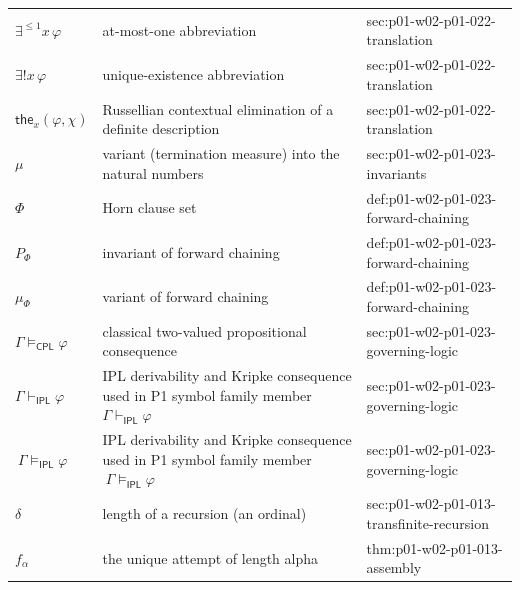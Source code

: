\begin{longtable}{@{}p{}p{}p{}@{}}
\(\exists^{\leq1}x\,\varphi\) & at-most-one abbreviation & sec:\allowbreak{}p01-\allowbreak{}w02-\allowbreak{}p01-\allowbreak{}022-\allowbreak{}translation \\
\(\exists!x\,\varphi\) & unique-existence abbreviation & sec:\allowbreak{}p01-\allowbreak{}w02-\allowbreak{}p01-\allowbreak{}022-\allowbreak{}translation \\
\(\mathsf{the}_x(\varphi,\allowbreak \chi)\) & Russellian contextual elimination of a definite description & sec:\allowbreak{}p01-\allowbreak{}w02-\allowbreak{}p01-\allowbreak{}022-\allowbreak{}translation \\
\(\mu\) & variant (termination measure) into the natural numbers & sec:\allowbreak{}p01-\allowbreak{}w02-\allowbreak{}p01-\allowbreak{}023-\allowbreak{}invariants \\
\(\Phi\) & Horn clause set & def:\allowbreak{}p01-\allowbreak{}w02-\allowbreak{}p01-\allowbreak{}023-\allowbreak{}forward-\allowbreak{}chaining \\
\(P_\Phi\) & invariant of forward chaining & def:\allowbreak{}p01-\allowbreak{}w02-\allowbreak{}p01-\allowbreak{}023-\allowbreak{}forward-\allowbreak{}chaining \\
\(\mu_\Phi\) & variant of forward chaining & def:\allowbreak{}p01-\allowbreak{}w02-\allowbreak{}p01-\allowbreak{}023-\allowbreak{}forward-\allowbreak{}chaining \\
\(\Gamma\models_{\mathsf{CPL}}\varphi\) & classical two-valued propositional consequence & sec:\allowbreak{}p01-\allowbreak{}w02-\allowbreak{}p01-\allowbreak{}023-\allowbreak{}governing-\allowbreak{}logic \\
\(\Gamma\vdash_{\mathsf{IPL}}\varphi\) & IPL derivability and Kripke consequence used in P1 symbol family member \(\Gamma\vdash_{\mathsf{IPL}}\varphi\) & sec:\allowbreak{}p01-\allowbreak{}w02-\allowbreak{}p01-\allowbreak{}023-\allowbreak{}governing-\allowbreak{}logic \\
\(\ \Gamma\models_{\mathsf{IPL}}\varphi\) & IPL derivability and Kripke consequence used in P1 symbol family member \(\ \Gamma\models_{\mathsf{IPL}}\varphi\) & sec:\allowbreak{}p01-\allowbreak{}w02-\allowbreak{}p01-\allowbreak{}023-\allowbreak{}governing-\allowbreak{}logic \\
\(\delta\) & length of a recursion (an ordinal) & sec:\allowbreak{}p01-\allowbreak{}w02-\allowbreak{}p01-\allowbreak{}013-\allowbreak{}transfinite-\allowbreak{}recursion \\
\(f_\alpha\) & the unique attempt of length alpha & thm:\allowbreak{}p01-\allowbreak{}w02-\allowbreak{}p01-\allowbreak{}013-\allowbreak{}assembly \\

\end{longtable}
